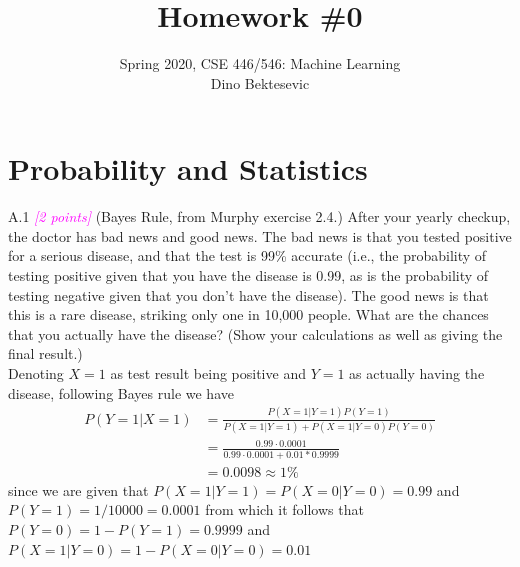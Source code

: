 \documentclass{article}
\date{{}}
\newcommand{\1}{\mathbf{1}}
\newcommand{\points}[1]{\small\textcolor{magenta}{\emph{[#1 points]}} \normalsize}
\begin{document}
\title{Homework \#0 }
\author{\normalsize{Spring 2020, CSE 446/546: Machine Learning}\\
\normalsize{Dino Bektesevic}}
\maketitle


\section*{Probability and Statistics}
A.1 \points{2} (Bayes Rule, from Murphy exercise 2.4.) After your yearly checkup, the doctor has bad news and good news. The bad news is that you tested positive for a serious disease, and that the test is 99\% accurate (i.e., the probability of testing positive given that you have the disease is 0.99, as is the probability of testing negative given that you don't have the disease). The good news is that this is a rare disease, striking only one in 10,000 people. What are the chances that you actually have the disease? (Show your calculations as well as giving the final result.)\\

Denoting $X=1$ as test result being positive and $Y=1$ as actually having the disease, following Bayes rule we have
\begin{align*}
    P(Y=1|X=1) &= \frac{P(X=1|Y=1)P(Y=1)}{P(X=1|Y=1)+P(X=1|Y=0)P(Y=0)} \\
    &= \frac{0.99\cdot0.0001}{0.99\cdot0.0001 + 0.01*0.9999} \\
    &= 0.0098 \approx 1\%
\end{align*}
since we are given that $P(X=1|Y=1)=P(X=0|Y=0)=0.99$ and $P(Y=1)=1/10000=0.0001$ from which it follows that $P(Y=0)=1-P(Y=1)=0.9999$ and $P(X=1|Y=0)=1-P(X=0|Y=0)=0.01$
\end{document}
